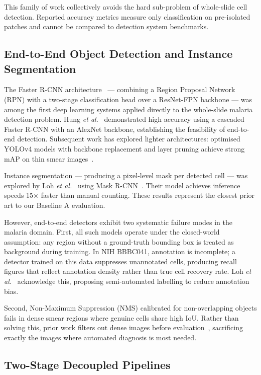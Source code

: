 \documentclass[review,12pt]{elsarticle}
\newcommand{\etal}{\textit{et al.}}
\begin{document}
This family of work collectively avoids the hard sub-problem of whole-slide
cell detection. Reported accuracy metrics measure only classification on
pre-isolated patches and cannot be compared to detection system benchmarks.

\subsection{End-to-End Object Detection and Instance Segmentation}
\label{ssec:e2e}

The Faster R-CNN architecture~\cite{ren2015} --- combining a Region Proposal
Network (RPN) with a two-stage classification head over a ResNet-FPN
backbone --- was among the first deep learning systems applied directly to
the whole-slide malaria detection problem. Hung \etal~\cite{hung2018}
demonstrated high accuracy using a cascaded Faster R-CNN with an AlexNet
backbone, establishing the feasibility of end-to-end detection. Subsequent
work has explored lighter architectures: optimised YOLOv4 models with
backbone replacement and layer pruning achieve strong mAP on thin
smear images~\cite{yolov4malaria2024}.

Instance segmentation --- producing a pixel-level mask per detected cell
--- was explored by Loh \etal~\cite{loh2021} using Mask R-CNN~\cite{he2017maskrcnn}.
Their model achieves inference speeds 15$\times$ faster than manual counting.
These results represent the closest prior art to our Baseline A evaluation.

However, end-to-end detectors exhibit two systematic failure modes in the
malaria domain. First, all such models operate under the closed-world
assumption: any region without a ground-truth bounding box is treated as
background during training. In NIH BBBC041, annotation is incomplete; a
detector trained on this data suppresses unannotated cells, producing recall
figures that reflect annotation density rather than true cell recovery rate.
Loh \etal~\cite{loh2021} acknowledge this, proposing semi-automated
labelling to reduce annotation bias.

Second, Non-Maximum Suppression (NMS) calibrated for non-overlapping objects
fails in dense smear regions where genuine cells share high IoU. Rather than
solving this, prior work filters out dense images before evaluation~\cite{loh2021},
sacrificing exactly the images where automated diagnosis is most needed.

\subsection{Two-Stage Decoupled Pipelines}
\label{ssec:twostage}
\end{document}
